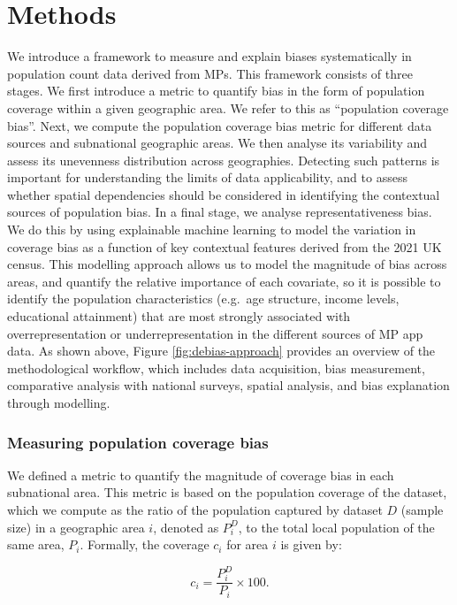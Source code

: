 \documentclass[]{rsos}%
\begin{document}
\section{Methods}\label{methods}

We introduce a framework to measure and explain biases systematically in
population count data derived from MPs. This framework
consists of three stages. We first introduce a metric to quantify bias
in the form of population coverage within a given geographic area. We
refer to this as ``population coverage bias''. Next, we compute the
population coverage bias metric for different data sources and
subnational geographic areas. We then analyse its variability and assess
its unevenness distribution across geographies. Detecting such patterns
is important for understanding the limits of data applicability, and to
assess whether spatial dependencies should be considered in identifying
the contextual sources of population bias. In a final stage, we analyse
representativeness bias. We do this by using explainable machine
learning to model the variation in coverage bias as a function of key
contextual features derived from the 2021 UK census. This modelling
approach allows us to model the magnitude of bias across areas, and
quantify the relative importance of each covariate, so it is possible to
identify the population characteristics (e.g.~age structure, income
levels, educational attainment) that are most strongly associated with
overrepresentation or underrepresentation in the different sources of MP
app data. As shown above, Figure \ref{fig:debias-approach} provides an overview of the methodological workflow,
which includes data acquisition, bias measurement, comparative analysis
with national surveys, spatial analysis, and bias explanation through
modelling.

\subsubsection{Measuring population coverage bias}\label{measuring-population-coverage-bias}

We defined a metric to quantify the magnitude of coverage bias in each
subnational area. This metric is based on the population coverage of the
dataset, which we compute as the ratio of the population captured by
dataset \(D\) (sample size) in a geographic area \(i\), denoted as \(P_i^D\),
to the total local population of the same area, \(P_i\). Formally, the
coverage \(c_i\) for area \(i\) is given by:

\begin{equation}
c_i = \dfrac{P_i^D}{P_i} \times 100.
\end{equation}
\end{document}

